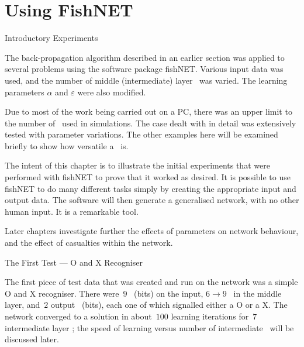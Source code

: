 \part {Using FishNET} {}

\chap Introductory Experiments

The back-propagation algorithm described in an earlier section was
applied to several problems using the software package fishNET.
Various input data was used, and the number of middle (intermediate)
layer \neus\ was varied.
The learning parameters $\alpha$ and $\varepsilon$ were also
modified.

Due to most of the work being carried out on a PC, there was an
upper limit to the number of \neus\ used in simulations.
The case dealt with in detail was extensively tested with parameter
variations.
The other examples here will be examined briefly to show how
versatile a \nn\ is.

The intent of this chapter is to illustrate
the initial experiments that were performed with fishNET to
prove that it worked as desired.
It is possible to use fishNET to do many different tasks simply by creating
the appropriate input and output data.
The software will then generate a generalised network, with no other
human input.
It is a remarkable tool.

Later chapters investigate further the effects of parameters on
network behaviour, and the effect of casualties within the network.

\sec The First Test --- O and X Recogniser

The first piece of test data that was created and run on the network
was a simple O and X recogniser.
There were~$9$ \neus\ (bits) on the input, $6 \to 9$ \neus\ in the middle
layer, and~$2$ output \neus\ (bits), each one of which signalled either a O
or a X.
The network converged to a solution in about~$100$ learning
iterations for~$7$ intermediate layer \neus; the speed of learning
versus number of intermediate \neus\ will be discussed later.

